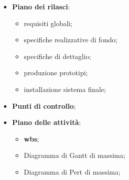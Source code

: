 \begin{description}
\begin{itemize}
            \item \textbf{Piano dei rilasci}:
                \begin{itemize}
                    \item requisiti globali;
                    \item specifiche realizzative di fondo;
                    \item specifiche di dettaglio;
                    \item produzione prototipi;
                    \item installazione sistema finale;
                \end{itemize}
            \item \textbf{Punti di controllo};
            \item \textbf{Piano delle attività}:
                \begin{itemize}
                    \item \textbf{\acf{wbs}};
                    \item Diagramma di Gantt di massima;
                    \item Diagramma di Pert di massima;
                \end{itemize}
        \end{itemize}
\end{description}
%
